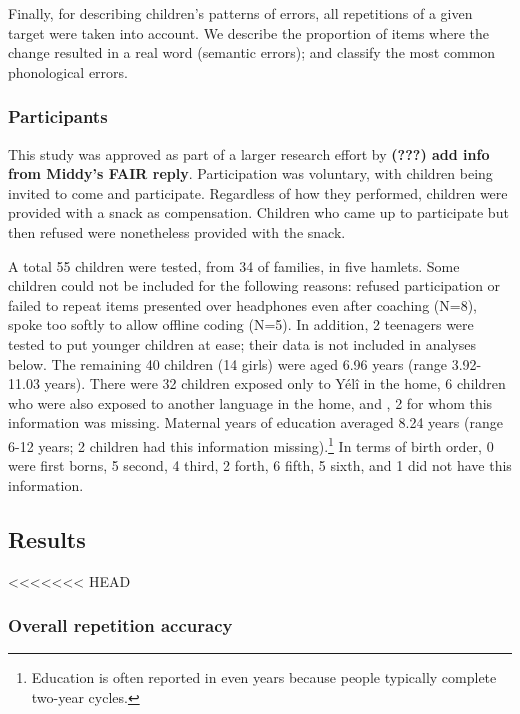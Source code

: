 \documentclass[english,,man,floatsintext]{apa6}
\begin{document}
Finally, for describing children's patterns of errors, all repetitions of a given target were taken into account. We describe the proportion of items where the change resulted in a real word (semantic errors); and classify the most common phonological errors.

\hypertarget{participants}{%
\subsubsection{Participants}\label{participants}}

This study was approved as part of a larger research effort by \textbf{({\textbf{???}}) add info from Middy's FAIR reply}. Participation was voluntary, with children being invited to come and participate. Regardless of how they performed, children were provided with a snack as compensation. Children who came up to participate but then refused were nonetheless provided with the snack.

A total 55 children were tested, from 34 of families, in five hamlets. Some children could not be included for the following reasons: refused participation or failed to repeat items presented over headphones even after coaching (N=8), spoke too softly to allow offline coding (N=5). In addition, 2 teenagers were tested to put younger children at ease; their data is not included in analyses below. The remaining 40 children (14 girls) were aged 6.96 years (range 3.92-11.03 years). There were 32 children exposed only to Yélî in the home, 6 children who were also exposed to another language in the home, and , 2 for whom this information was missing. Maternal years of education averaged 8.24 years (range 6-12 years; 2 children had this information missing).\footnote{Education is often reported in even years because people typically complete two-year cycles.} In terms of birth order, 0 were first borns, 5 second, 4 third, 2 forth, 6 fifth, 5 sixth, and 1 did not have this information.

\hypertarget{results}{%
\subsection{Results}\label{results}}

<<<<<<< HEAD
\hypertarget{overall-repetition-accuracy}{%
\subsubsection{Overall repetition accuracy}\label{overall-repetition-accuracy}}
\end{document}
